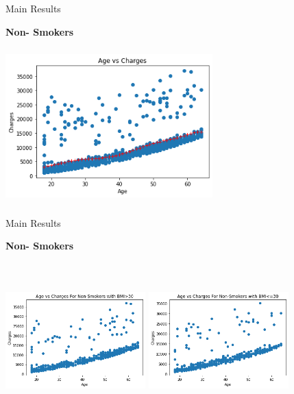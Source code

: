\documentclass[handout,9pt]{beamer}
\numberwithin{theorem}{section}
\begin{document}
\begin{frame}{Main Results}
	\begin{spacing}{1}
		\textbf{Non- Smokers}
		\begin{center}
			\includegraphics[height=6cm, width=8cm]{work16}
		\end{center}
	\end{spacing}
\end{frame}

\begin{frame}{Main Results}
	\begin{spacing}{1}
		\textbf{Non- Smokers}
		\begin{center}
			\includegraphics[height=6cm, width=5.4cm]{work17}
			\includegraphics[height=6cm, width=5.4cm]{work18}
		\end{center}
	\end{spacing}
\end{frame}
\end{document}
